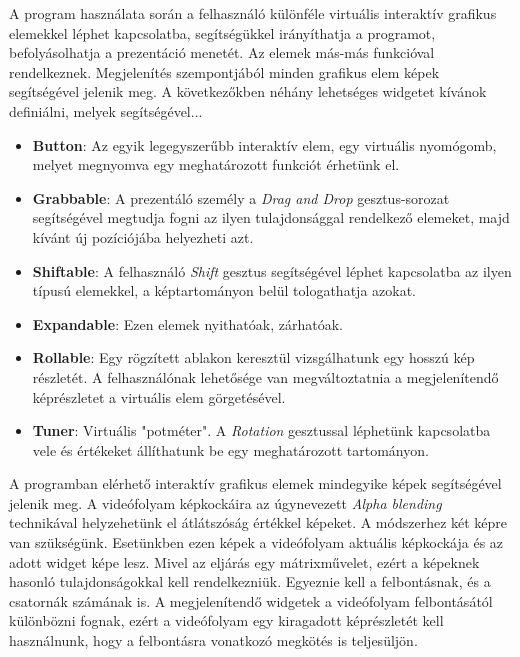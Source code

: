 

A program használata során a felhasználó különféle virtuális interaktív grafikus elemekkel léphet kapcsolatba, segítségükkel irányíthatja a programot, befolyásolhatja a prezentáció menetét. Az elemek más-más funkcióval rendelkeznek. Megjelenítés szempontjából minden grafikus elem képek segítségével jelenik meg. A következőkben néhány lehetséges widgetet kívánok definiálni, melyek segítségével...
\begin{itemize}
	\item \textbf{Button}: Az egyik legegyszerűbb interaktív elem, egy virtuális nyomógomb, melyet megnyomva egy meghatározott funkciót érhetünk el.
	\item \textbf{Grabbable}: A prezentáló személy a \textit{Drag and Drop} gesztus-sorozat segítségével megtudja fogni az ilyen tulajdonsággal rendelkező elemeket, majd kívánt új pozíciójába helyezheti azt.
	\item \textbf{Shiftable}: A felhasználó \textit{Shift} gesztus segítségével léphet kapcsolatba az ilyen típusú elemekkel, a képtartományon belül tologathatja azokat.
	\item \textbf{Expandable}: Ezen elemek nyithatóak, zárhatóak.
	\item \textbf{Rollable}: Egy rögzített ablakon keresztül vizsgálhatunk egy hosszú kép részletét. A felhasználónak lehetősége van megváltoztatnia a megjelenítendő képrészletet a virtuális elem görgetésével.
	\item \textbf{Tuner}: Virtuális "potméter". A \textit{Rotation} gesztussal léphetünk kapcsolatba vele és értékeket állíthatunk be egy meghatározott tartományon.
\end{itemize}


A programban elérhető interaktív grafikus elemek mindegyike képek segítségével jelenik meg. A videófolyam képkockáira az úgynevezett \textit{Alpha blending}\cite{salvi2014multi} technikával helyzehetünk el átlátszóság értékkel képeket. A módszerhez két képre van szükségünk. Esetünkben ezen képek a videófolyam aktuális képkockája és az adott widget képe lesz. Mivel az eljárás egy mátrixművelet, ezért a képeknek hasonló tulajdonságokkal kell rendelkezniük. Egyeznie kell a felbontásnak, és a csatornák számának is. A megjelenítendő widgetek a videófolyam felbontásától különbözni fognak, ezért a videófolyam egy kiragadott képrészletét kell használnunk, hogy a felbontásra vonatkozó megkötés is teljesüljön.

